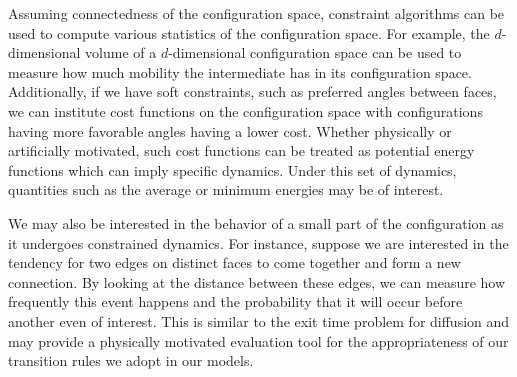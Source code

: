 Assuming connectedness of the configuration space, constraint algorithms can be used to compute various statistics of the configuration space. For example, the $d$-dimensional volume of a $d$-dimensional configuration space can be used to measure how much mobility the intermediate has in its configuration space. Additionally, if we have soft constraints, such as preferred angles between faces, we can institute cost functions on the configuration space with configurations having more favorable angles having a lower cost. Whether physically or artificially motivated, such cost functions can be treated as potential energy functions which can imply specific dynamics. Under this set of dynamics, quantities such as the average or minimum energies may be of interest. 

We may also be interested in the behavior of a small part of the configuration as it undergoes constrained dynamics. For instance, suppose we are interested in the tendency for two edges on distinct faces to come together and form a new connection. By looking at the distance between these edges, we can measure how frequently this event happens and the probability that it will occur before another even of interest. This is similar to the exit time problem for diffusion and may provide a physically motivated evaluation tool for the appropriateness of our transition rules we adopt in our models. 

